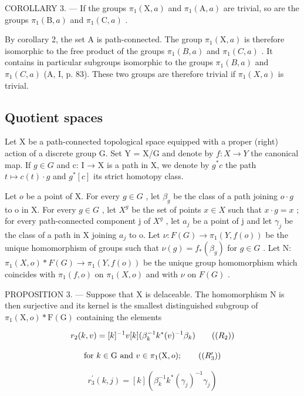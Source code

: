 COROLLARY 3. --- If the groups \(\pi_1(\mathrm{X},a)\) and \(\pi_1(\mathrm{A},a)\) are trivial, so are the groups \(\pi_1(\mathrm{B},a)\) and \(\pi_1(\mathrm{C},a)\) .

By corollary 2, the set A is path-connected. The group \(\pi_1(\mathrm{X},a)\) is therefore isomorphic to the free product of the groups \(\pi_{1}(B,a)\) and \(\pi_{1}(C,a)\) . It contains in particular subgroups isomorphic to the groups \(\pi_{1}(B,a)\) and \(\pi_{1}(C,a)\) (A, I, p. 83). These two groups are therefore trivial if \(\pi_{1}(X,a)\) is trivial.

\subsection{Quotient spaces}

Let X be a path-connected topological space equipped with a proper (right) action of a discrete group G. Set Y = X/G and denote by \(f: X \to Y\) the canonical map. If \(g \in G\) and c: I → X is a path in X, we denote by \(g^{*}c\) the path \(t \mapsto c(t) \cdot g\) and \(g^{*}[c]\) its strict homotopy class.

Let \(o\) be a point of X. For every \(g \in G\) , let \(\beta_{g}\) be the class of a path joining \(o \cdot g\) to o in X. For every \(g \in G\) , let \(X^{g}\) be the set of points \(x \in X\) such that \(x \cdot g = x\) ; for every path-connected component j of \(X^{g}\) , let \(a_{j}\) be a point of j and let \(\gamma_{j}\) be the class of a path in X joining \(a_{j}\) to o. Let \(\nu: F(G) \to \pi_{1}(Y, f(o))\) be the unique homomorphism of groups such that \(\nu(g) = f_{*}(\beta_{g})\) for \(g \in G\) . Let N: \(\pi_{1}(X, o) * F(G) \to \pi_{1}(Y, f(o))\) be the unique group homomorphism which coincides with \(\pi_{1}(f, o)\) on \(\pi_{1}(X, o)\) and with \(\nu\) on \(F(G)\) .

PROPOSITION 3. --- Suppose that X is delaceable. The homomorphism N is then surjective and its kernel is the smallest distinguished subgroup of \(\pi_{1}(\mathrm{X},o)*\mathrm{F}(\mathrm{G})\) containing the elements

\[
r _ {2} (k, v) = [ k ] ^ {- 1} v [ k ] (\beta_ {k} ^ {- 1} k ^ {*} (v) ^ {- 1} \beta_ {k})\tag{\((R_{2})\)}
\]

\[
\text {for } k \in \mathrm{G} \text { and } v \in \pi_ {1} (\mathrm{X}, o);\tag{\((R_{3}^{\prime})\)}
\]

\[
r _ {3} ^ {\prime} (k, j) = [ k ] (\beta_ {k} ^ {- 1} k ^ {*} (\gamma_ {j}) ^ {- 1} \gamma_ {j})
\]

